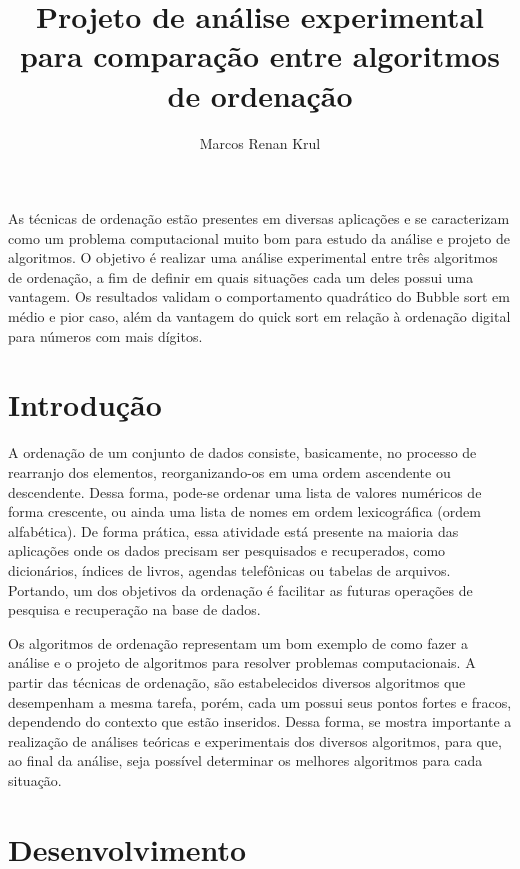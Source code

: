\documentclass[12pt]{article}
\title{Projeto de análise experimental para comparação entre algoritmos de ordenação}
\author{Marcos Renan Krul}
\begin{document}
 

\maketitle
     
\begin{resumo} 
 
 As técnicas de ordenação estão presentes em diversas aplicações e se caracterizam como um problema computacional muito bom para estudo da análise e projeto de algoritmos. O objetivo é realizar uma análise experimental entre três algoritmos de ordenação, a fim de definir em quais situações cada um deles possui uma vantagem. Os resultados validam o comportamento quadrático do Bubble sort em médio e pior caso, além da vantagem do quick sort em relação à ordenação digital para números com mais dígitos. 

\end{resumo}

\section{Introdução}

A ordenação de um conjunto de dados consiste, basicamente, no processo de rearranjo dos elementos, reorganizando-os em uma ordem ascendente ou descendente. Dessa forma, pode-se ordenar uma lista de valores numéricos de forma crescente, ou ainda uma lista de nomes em ordem lexicográfica (ordem alfabética). De forma prática, essa atividade está presente na maioria das aplicações onde os dados precisam ser pesquisados e recuperados, como dicionários, índices de livros, agendas telefônicas ou tabelas de arquivos. Portando, um dos objetivos da ordenação é facilitar as futuras operações de pesquisa e recuperação na base de dados. \cite{projeto:99}

Os algoritmos de ordenação representam um bom exemplo de como fazer a análise e o projeto de algoritmos para resolver problemas computacionais. A partir das técnicas de ordenação, são estabelecidos diversos algoritmos que desempenham a mesma tarefa, porém, cada um possui seus pontos fortes e fracos, dependendo do contexto que estão inseridos. Dessa forma, se mostra importante a realização de análises teóricas e experimentais dos diversos algoritmos, para que, ao final da análise, seja possível determinar os melhores algoritmos para cada situação. \cite{projeto:99}

\section{Desenvolvimento}
\end{document}
